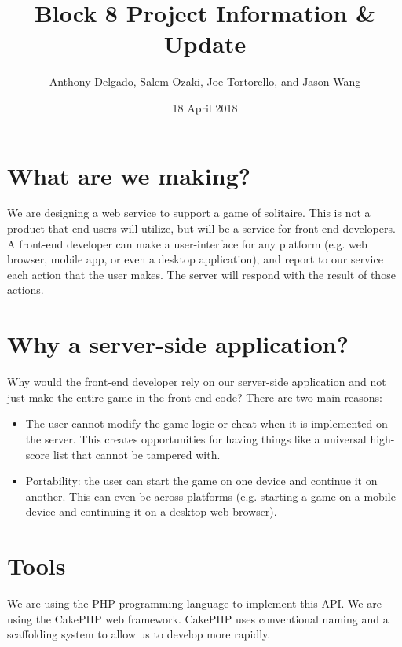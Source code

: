 \documentclass[11pt]{article}
\title{Block 8 Project Information \& Update}
\author{Anthony Delgado, Salem Ozaki, Joe Tortorello, and Jason Wang}
\date{18 April 2018}
\begin{document}



\maketitle
\section*{What are we making?}
We are designing a web service to support a game of solitaire. This is not a product that end-users will utilize, but will be a service for front-end developers. A front-end developer can make a user-interface for any platform (e.g. web browser, mobile app, or even a desktop application), and report to our service each action that the user makes. The server will respond with the result of those actions.

\section*{Why a server-side application?}
Why would the front-end developer rely on our server-side application and not just make the entire game in the front-end code? There are two main reasons:
\begin{itemize}
	\item The user cannot modify the game logic or cheat when it is implemented on the server. This creates opportunities for having things like a universal high-score list that cannot be tampered with.
	\item Portability: the user can start the game on one device and continue it on another. This can even be across platforms (e.g. starting a game on a mobile device and continuing it on a desktop web browser).
\end{itemize}

\section*{Tools}
We are using the PHP programming language to implement this API. We are using the CakePHP web framework. CakePHP uses conventional naming and a scaffolding system to allow us to develop more rapidly.
\end{document}
